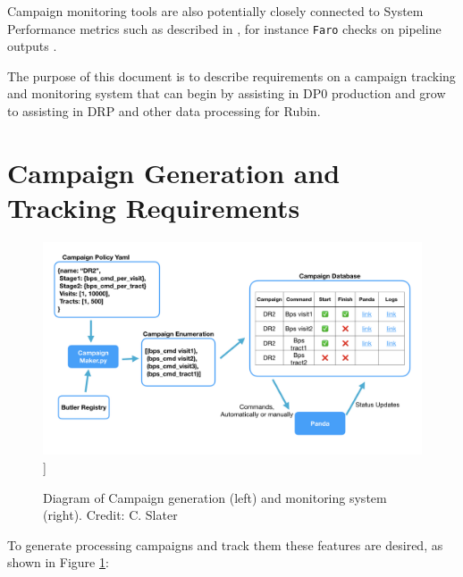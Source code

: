 \documentclass[DM,authoryear,toc]{lsstdoc}
\begin{document}
Campaign monitoring tools are also potentially closely connected to
System Performance metrics such as described in \cite{DMTN-173}, 
for instance \texttt{Faro} checks on pipeline outputs \cite{DMTR-311}.

The purpose of this document is to describe requirements on a campaign
tracking and monitoring system that can begin by assisting in DP0 
\cite{RTN-001} production and grow to assisting in DRP and other 
data processing for Rubin.

\section{Campaign Generation and Tracking Requirements}

\begin{figure}
\includegraphics[width=\textwidth]{CampaignTooling.jpg}]
\caption{Diagram of Campaign generation (left) and monitoring system (right).
Credit: C. Slater}
\label{CampaignTooling}
\end{figure}

To generate processing campaigns and track them these features are desired,
as shown in Figure \ref{CampaignTooling}:
\end{document}
